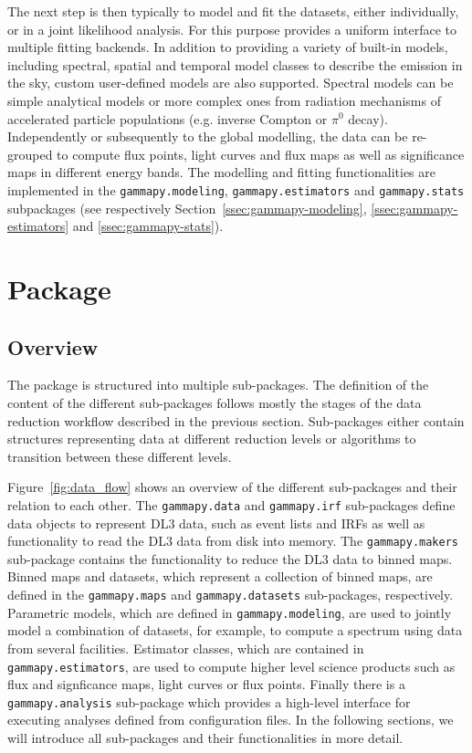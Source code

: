 \documentclass[longauth]{aa}
\newcommand{\code}[1]{\texttt{#1}}
\begin{document}
The next step is then typically to model and fit the datasets, either
individually, or in a joint likelihood analysis. For this purpose \gammapy
provides a uniform interface to multiple fitting backends. In addition to
providing a variety of built-in models, including spectral,
spatial and temporal model classes to describe the \gammaray emission in the sky,
custom user-defined models are also supported.
Spectral models can be simple analytical models or more complex ones from radiation
mechanisms of accelerated particle populations (e.g. inverse Compton or $\pi^{0}$ decay).
Independently or subsequently to the global modelling, the data can be
re-grouped to compute flux points, light curves and flux maps as well as significance
maps in different energy bands.
The modelling and fitting functionalities are implemented in the \code{gammapy.modeling},
\code{gammapy.estimators} and \code{gammapy.stats} subpackages (see respectively
Section~\ref{ssec:gammapy-modeling}, \ref{ssec:gammapy-estimators} and \ref{ssec:gammapy-stats}).

\section{\gammapy Package}
\label{sec:gammapy-package}
\subsection{Overview}
\label{ssec:overview}
%
%
The \gammapy package is structured into multiple sub-packages. The definition
of the content of the different sub-packages follows mostly the stages of the
data reduction workflow described in the previous section. Sub-packages
either contain structures representing data at different reduction
levels or algorithms to transition between these different levels.

Figure~\ref{fig:data_flow} shows an overview of the different sub-packages and
their relation to each other. The \code{gammapy.data} and \code{gammapy.irf}
sub-packages define data objects to represent DL3 data, such as
event lists and IRFs as well as functionality
to read the DL3 data from disk into memory. The \code{gammapy.makers} sub-package
contains the functionality to reduce the DL3 data to binned maps.
Binned maps and datasets, which represent a collection of binned
maps, are defined in the \code{gammapy.maps} and \code{gammapy.datasets}
sub-packages, respectively. Parametric models, which are defined in
\code{gammapy.modeling}, are used to jointly model a combination
of datasets, for example, to compute a spectrum using data from several facilities. Estimator classes,
which are contained in \code{gammapy.estimators}, are used to
compute higher level science products such as flux and signficance maps,
light curves or flux points. Finally there is a \code{gammapy.analysis}
sub-package which provides a high-level interface for executing analyses
defined from configuration files. In the following sections, we will
introduce all sub-packages and their functionalities in more detail.
\end{document}
